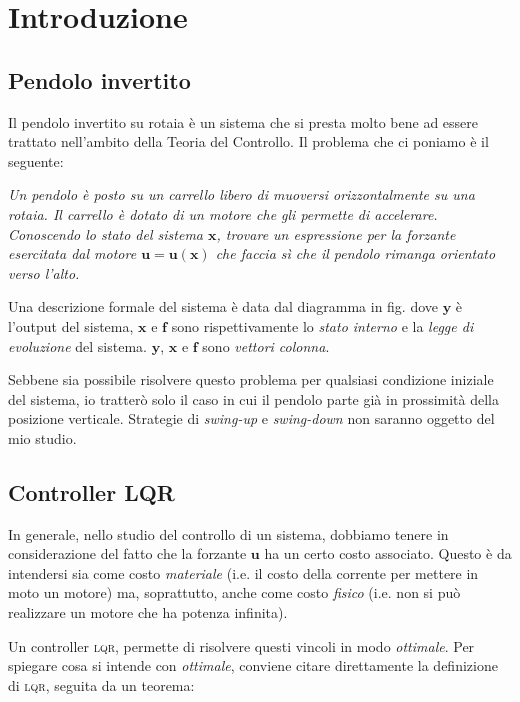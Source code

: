 \section{Introduzione}\label{sec:introduzione}
\subsection{Pendolo invertito}\label{subsec:intro-pendolo}
Il pendolo invertito su rotaia è un sistema che si presta molto bene ad essere trattato nell'ambito della Teoria del
Controllo.
Il problema che ci poniamo è il seguente:
\begin{framed}
\emph{
    Un pendolo è posto su un carrello libero di muoversi orizzontalmente su una rotaia.
    Il carrello è dotato di un motore che gli permette di accelerare. Conoscendo lo stato del sistema
    $\mathbf x$, trovare un espressione per la forzante esercitata dal motore $\mathbf u = \mathbf u(\mathbf x)$ che faccia sì
    che il pendolo rimanga orientato verso l'alto.
  }
\end{framed}

Una descrizione formale del sistema è data dal diagramma in fig. %
dove $\mathbf y$ è l'output del sistema, $\mathbf x$ e $\mathbf f$ sono rispettivamente
lo \emph{stato interno} e la \emph{legge di evoluzione} del sistema. $\mathbf y$, $\mathbf x$ e $\mathbf f$ sono
\emph{vettori colonna}.

Sebbene sia possibile risolvere questo problema per qualsiasi condizione iniziale del sistema, io tratterò solo il
caso in cui il pendolo parte già in prossimità della posizione verticale. Strategie di \emph{swing-up} e
\emph{swing-down} non saranno oggetto del mio studio.


\subsection{Controller \textsc{LQR}}\label{subsec:intro-lqg}
In generale, nello studio del controllo di un sistema, dobbiamo tenere in considerazione del fatto che la forzante
$\mathbf u$ ha un certo costo associato.
Questo è da intendersi sia come costo \emph{materiale} (i.e. il costo della corrente per mettere in moto
un motore) ma, soprattutto, anche come costo \emph{fisico} (i.e. non si può realizzare un motore che ha potenza
infinita).

Un controller \textsc{lqr}, permette di risolvere questi vincoli in modo \emph{ottimale}. %
Per spiegare cosa si intende con \emph{ottimale}, conviene citare direttamente la definizione di \textsc{lqr}, seguita
da un teorema:


